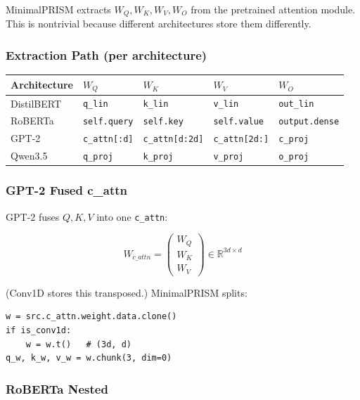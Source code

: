 MinimalPRISM extracts $W_Q, W_K, W_V, W_O$ from the pretrained attention 
module. This is nontrivial because different architectures store them 
differently.

\subsubsection{Extraction Path (per architecture)}

\begin{table}[H]
\centering
\small
\begin{tabular}{lllll}
\toprule
\textbf{Architecture} & \textbf{$W_Q$} & \textbf{$W_K$} & \textbf{$W_V$} & \textbf{$W_O$} \\
\midrule
DistilBERT & \texttt{q\_lin} & \texttt{k\_lin} & \texttt{v\_lin} & \texttt{out\_lin} \\
RoBERTa & \texttt{self.query} & \texttt{self.key} & \texttt{self.value} & \texttt{output.dense} \\
GPT-2 & \texttt{c\_attn[:d]} & \texttt{c\_attn[d:2d]} & \texttt{c\_attn[2d:]} & \texttt{c\_proj} \\
Qwen3.5 & \texttt{q\_proj} & \texttt{k\_proj} & \texttt{v\_proj} & \texttt{o\_proj} \\
\bottomrule
\end{tabular}
\end{table}

\subsubsection{GPT-2 Fused c\_attn}

GPT-2 fuses $Q, K, V$ into one \texttt{c\_attn}:

\[
W_{c\_attn} = \begin{pmatrix} W_Q \\ W_K \\ W_V \end{pmatrix} \in \mathbb{R}^{3d \times d}
\tag{4.7}
\]

(Conv1D stores this transposed.) MinimalPRISM splits:

\begin{lstlisting}
w = src.c_attn.weight.data.clone()
if is_conv1d:
    w = w.t()   # (3d, d)
q_w, k_w, v_w = w.chunk(3, dim=0)
\end{lstlisting}

\subsubsection{RoBERTa Nested}


